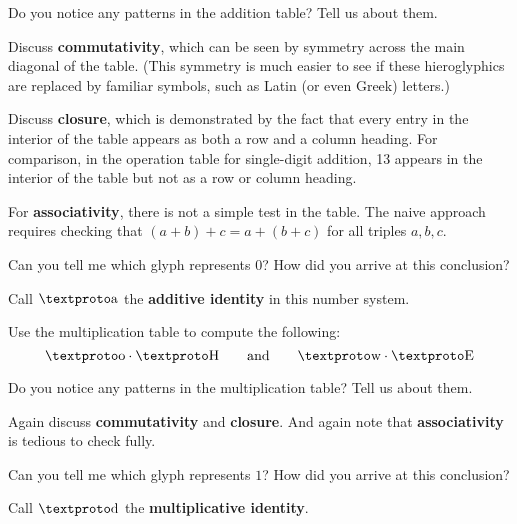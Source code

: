 \documentclass[nooutcomes]{ximera}
\begin{document}
\begin{problem} 
Do you notice any patterns in the addition table? Tell us about them.
\begin{teachingnote}
Discuss \textbf{commutativity}, which can be seen by symmetry across the main diagonal of the table.  (This symmetry is much easier to see if these hieroglyphics are replaced by familiar symbols, such as Latin (or even Greek) letters.)  

Discuss \textbf{closure}, which is demonstrated by the fact that every entry in the interior of the table appears as both a row and a column heading.  For comparison, in the operation table for single-digit addition, 13 appears in the interior of the table but not as a row or column heading.  

For \textbf{associativity}, there is not a simple test in the table.  The naive approach requires checking that $(a + b) + c = a + (b + c)$ for all triples $a, b, c$.  
\end{teachingnote}
\end{problem}

\begin{problem} 
Can you tell me which glyph represents $0$? How did you arrive at this
conclusion?
\begin{teachingnote}
Call $\lo$ the \textbf{additive identity} in this number system.
\end{teachingnote}
\end{problem}

\begin{problem} 
Use the multiplication table to compute the following:
\[
\li \cdot \lb \qquad\text{and}\qquad \la \cdot \lf
\]
\end{problem}

\begin{problem} 
Do you notice any patterns in the multiplication table? Tell us about them.
\begin{teachingnote}
Again discuss \textbf{commutativity} and \textbf{closure}.  And again note that \textbf{associativity} is tedious to check fully.  
\end{teachingnote}

\end{problem}

\begin{problem} 
Can you tell me which glyph represents $1$? How did you arrive at this
conclusion?
\begin{teachingnote}
Call $\loo$ the \textbf{multiplicative identity}.  
\end{teachingnote}
\end{problem}
\end{document}
